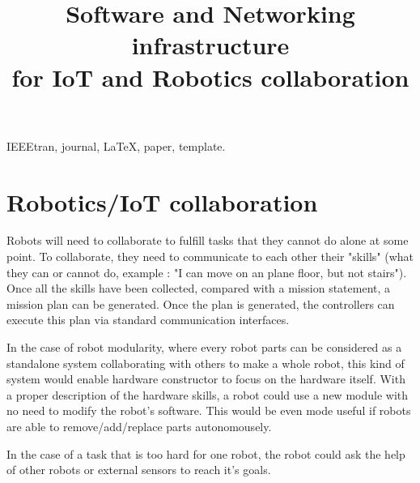 \documentclass[conference]{IEEEtran}
\begin{document}
\title{Software and Networking infrastructure \\for IoT and Robotics collaboration}

\author{
\and
{}
\and
{}
}

\maketitle

\begin{abstract}
\end{abstract}

\begin{IEEEkeywords}
IEEEtran, journal, \LaTeX, paper, template.
\end{IEEEkeywords}

\IEEEpeerreviewmaketitle

\section{Robotics/IoT collaboration}

Robots will need to collaborate to fulfill tasks that they cannot do alone at some point.
To collaborate, they need to communicate to each other their "skills" (what they can or cannot do, example : "I can move on an plane floor, but not stairs").
Once all the skills have been collected, compared with a mission statement, a mission plan can be generated.
Once the plan is generated, the controllers can execute this plan via standard communication interfaces.

In the case of robot modularity, where every robot parts can be considered as a standalone system collaborating with others to make a whole robot, this kind of system would enable hardware constructor to focus on the hardware itself.
With a proper description of the hardware skills, a robot could use a new module with no need to modify the robot's software.
This would be even mode useful if robots are able to remove/add/replace parts autonomousely.

In the case of a task that is too hard for one robot, the robot could ask the help of other robots or external sensors to reach it's goals.
\end{document}
